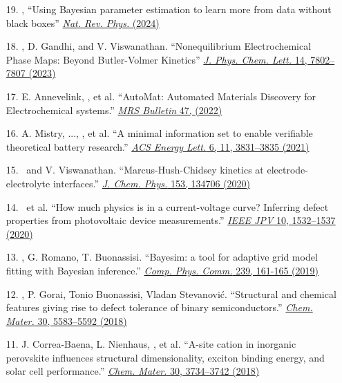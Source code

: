 \begin{enumerate}
        \item[19.] \myname, ``Using Bayesian parameter estimation to learn more from data without black boxes'' \href{https://www.nature.com/articles/s42254-024-00698-0}{\textit{Nat. Rev. Phys.} (2024)}

        \item[18.] \myname, D. Gandhi, and V. Viswanathan. ``Nonequilibrium Electrochemical Phase Maps: Beyond Butler-Volmer Kinetics'' \href{https://pubs.acs.org/doi/10.1021/acs.jpclett.3c01992}{\textit{J. Phys. Chem. Lett.} 14, 7802--7807 (2023)}

        \item[17.] E. Annevelink\ec, \myname\ec, et al. ``AutoMat: Automated Materials Discovery for Electrochemical systems.'' \href{https://doi.org/10.1557/s43577-022-00424-0}{\textit{MRS Bulletin} 47, (2022)}

        \item[16.] A. Mistry, ..., \myname, et al. ``A minimal information set to enable verifiable theoretical battery research.'' \href{https://pubs.acs.org/doi/10.1021/acsenergylett.1c01710}{\textit{ACS Energy Lett.} 6, 11, 3831--3835 (2021)}

        \item[15.] \myname~and V. Viswanathan. ``Marcus-Hush-Chidsey kinetics at electrode-electrolyte interfaces.'' \href{https://aip.scitation.org/doi/10.1063/5.0023611}{\textit{J. Chem. Phys.} 153, 134706 (2020)}

        \item[14.] \myname~et al. ``How much physics is in a current-voltage curve? Inferring defect properties from photovoltaic device measurements.'' \href{https://ieeexplore.ieee.org/document/9157971}{\textit{IEEE JPV} 10, 1532--1537 (2020)}

        \item[13.] \myname, G. Romano, T. Buonassisi. ``Bayesim: a tool for adaptive grid model fitting with Bayesian inference.'' \href{https://www.sciencedirect.com/science/article/pii/S0010465519300414?via\%3Dihub}{\textit{Comp. Phys. Comm.} 239, 161-165 (2019)}

        \item[12.] \myname\ec, P. Gorai\ec, Tonio Buonassisi, Vladan Stevanovi\'c. ``Structural and chemical features giving rise to defect tolerance of binary semiconductors.'' \href{https://pubs.acs.org/doi/10.1021/acs.chemmater.8b01505}{\textit{Chem. Mater.} 30, 5583--5592 (2018)}

        \item[11.] J. Correa-Baena, L. Nienhaus, \myname, et al. ``A-site cation in inorganic  perovskite influences structural dimensionality, exciton binding energy, and solar cell performance.'' \href{https://pubs.acs.org/doi/10.1021/acs.chemmater.8b00676}{\textit{Chem. Mater.} 30, 3734--3742 (2018)}


\end{enumerate}
